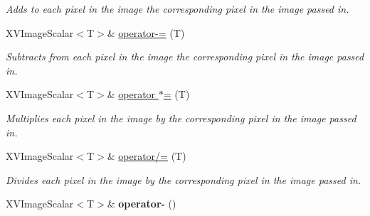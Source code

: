 \begin{CompactItemize}
\begin{CompactList}\small\item\em Adds to each pixel in the image the corresponding pixel in the image passed in.\item\end{CompactList}\item 
\label{XVImageScalar_a23}
\hypertarget{class_XVImageScalar_a23}{
XVImage\-Scalar$<$T$>$\& \hyperlink{class_XVImageScalar_a23}{operator-=} (T)}

\begin{CompactList}\small\item\em Subtracts from each pixel in the image the corresponding pixel in the image passed in.\item\end{CompactList}\item 
\label{XVImageScalar_a24}
\hypertarget{class_XVImageScalar_a24}{
XVImage\-Scalar$<$T$>$\& \hyperlink{class_XVImageScalar_a24}{operator $\ast$=} (T)}

\begin{CompactList}\small\item\em Multiplies each pixel in the image by the corresponding pixel in the image passed in.\item\end{CompactList}\item 
\label{XVImageScalar_a25}
\hypertarget{class_XVImageScalar_a25}{
XVImage\-Scalar$<$T$>$\& \hyperlink{class_XVImageScalar_a25}{operator/=} (T)}

\begin{CompactList}\small\item\em Divides each pixel in the image by the corresponding pixel in the image passed in.\item\end{CompactList}\item 
\label{XVImageScalar_a26}
\hypertarget{class_XVImageScalar_a26}{
XVImage\-Scalar$<$T$>$\& {\bf operator-} ()}

\end{CompactItemize}


